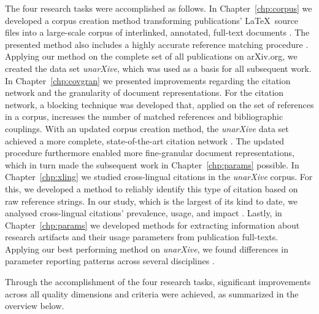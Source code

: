 The four research tasks were accomplished as follows. %
In Chapter~\ref{chp:corpus} we developed a corpus creation method transforming publications' \LaTeX\ source files into a large-scale corpus of interlinked, annotated, full-text documents \rtmark{1\large\checkmark}. The presented method also includes a highly accurate reference matching procedure . Applying our method on the complete set of all publications on arXiv.org, we created the data set \emph{unarXive}, which was used as a basis for all subsequent work. %
In Chapter~\ref{chp:covgran} we presented improvements regarding the citation network and the granularity of document representations. For the citation network, a blocking technique was developed that, applied on the set of references in a corpus, increases the number of matched references and bibliographic couplings. With an updated corpus creation method, the \emph{unarXive} data set achieved a more complete, state-of-the-art citation network \rtmark{2\large\checkmark}. The updated procedure furthermore enabled more fine-granular document representations, which in turn made the subsequent work in Chapter~\ref{chp:params} possible. %
In Chapter~\ref{chp:xling} we studied cross-lingual citations in the \emph{unarXive} corpus. For this, we developed a method to reliably identify this type of citation based on raw reference strings. In our study, which is the largest of its kind to date, we analysed cross-lingual citations' prevalence, usage, and impact \rtmark{3\large\checkmark}. %
Lastly, in Chapter~\ref{chp:params} we developed methods for extracting information about research artifacts and their usage parameters from publication full-texts. Applying our best performing method on \emph{unarXive}, we found differences in parameter reporting patterns across several disciplines \rtmark{4\large\checkmark}. %

Through the accomplishment of the four research tasks, significant improvements across all quality dimensions and criteria were achieved, as summarized in the overview below.

